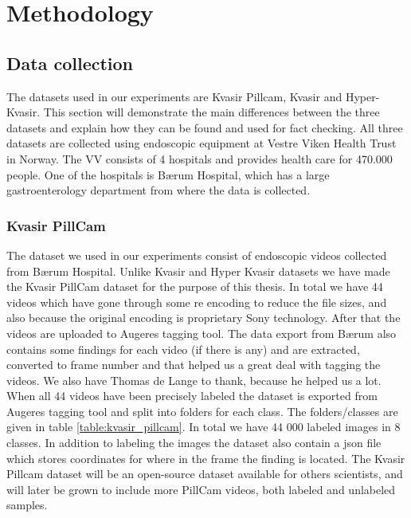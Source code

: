 \documentclass[thesis.tex]{subfiles}
\begin{document}
\chapter{Methodology} \label{methodology}


\section{Data collection} \label{datacollection}
The datasets used in our experiments are Kvasir Pillcam, Kvasir and Hyper-Kvasir. This section will demonstrate the main differences between the three datasets and explain how they can be found and used for fact checking. All three datasets are collected using endoscopic equipment at Vestre Viken Health Trust in Norway. The VV consists of 4 hospitals and provides health care for 470.000 people. One of the hospitals is Bærum Hospital, which has a large gastroenterology department from where the data is collected. 

\subsection{Kvasir PillCam} \label{kvasir_pillcam}
The dataset we used in our experiments consist of endoscopic videos collected from Bærum Hospital. Unlike Kvasir and Hyper Kvasir datasets we have made the Kvasir PillCam dataset for the purpose of this thesis. In total we have 44 videos which have gone through some re encoding to reduce the file sizes, and also because the original encoding is proprietary Sony technology. After that the videos are uploaded to Augeres tagging tool. The data export from Bærum also contains some findings for each video (if there is any) and are extracted, converted to frame number and that helped us a great deal with tagging the videos. We also have Thomas de Lange to thank, because he helped us a lot. When all 44 videos have been precisely labeled the dataset is exported from Augeres tagging tool and split into folders for each class. The folders/classes are given in table \ref{table:kvasir_pillcam}. In total we have 44 000 labeled images in 8 classes. In addition to labeling the images the dataset also contain a json file which stores coordinates for where in the frame the finding is located. The Kvasir Pillcam dataset will be an open-source dataset available for others scientists, and will later be grown to include more PillCam videos, both labeled and unlabeled samples.
\end{document}
